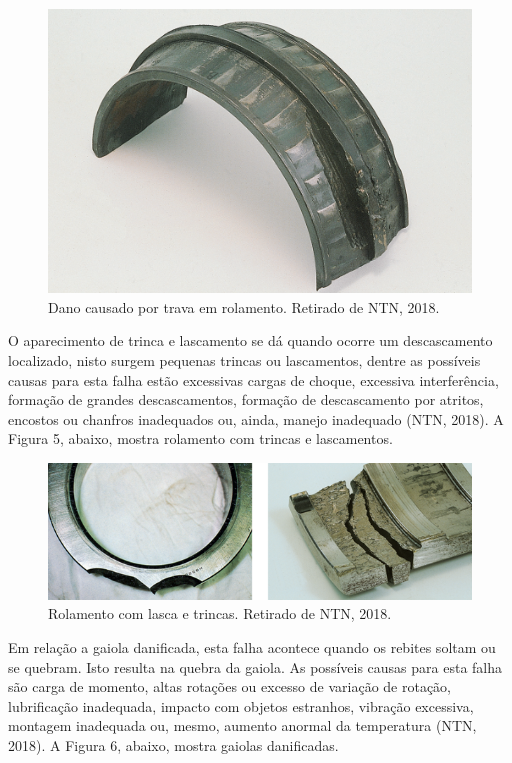 \documentclass[
	12pt,				
	oneside,			
	a4paper,			
	english,			
	brazil				
	]{abntex2ppgsi}
\begin{document}
\begin{figure}[!htb]
\centering
\includegraphics{Figura4}
\caption {Dano causado por trava em rolamento. Retirado de NTN, 2018.}
\label{Figura4}
\end{figure}


O aparecimento de trinca e lascamento se dá quando ocorre um descascamento localizado, nisto surgem pequenas trincas ou lascamentos, dentre as possíveis causas para esta falha estão excessivas cargas de choque, excessiva interferência, formação de grandes descascamentos, formação de descascamento por atritos, encostos ou chanfros inadequados ou, ainda, manejo inadequado (NTN, 2018). A Figura 5, abaixo, mostra rolamento com trincas e lascamentos. 

\begin{figure}[!htb]
\centering
\includegraphics{Figura5}
\caption {Rolamento com lasca e trincas. Retirado de NTN, 2018.}
\label{Figura5}
\end{figure}

Em relação a gaiola danificada, esta falha acontece quando os rebites  soltam ou se quebram. Isto resulta na quebra da gaiola. As possíveis causas para esta falha são carga de momento, altas rotações ou excesso de variação de rotação, lubrificação inadequada, impacto com objetos estranhos, vibração excessiva, montagem inadequada ou, mesmo, aumento anormal da temperatura (NTN, 2018). A Figura 6, abaixo, mostra gaiolas danificadas. 
\end{document}
